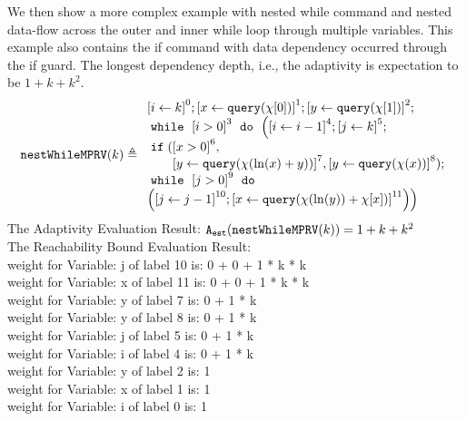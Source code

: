             \begin{example}
   \label{ex:nestedWhileMPRV}
   We then show a more complex example with nested while command and nested data-flow across the outer and inner while loop through multiple variables.
   This example also contains the if command with data dependency occurred through the if guard.
   The longest dependency depth, i.e., the adaptivity is expectation to be $1 + k + k^2 $.
   \[
   \kw{nestWhileMPRV}(k) \triangleq 
   \begin{array}{l}
\clabel{\assign{i}{k} }^{0} ; 
\clabel{ \assign{x}{\query(\chi[0])}}^{1} ; 
\clabel{ \assign{y}{\query(\chi[1])}}^{2} ; \\
    \ewhile ~ \clabel{i > 0}^{3} ~ \edo ~ 
    \Big(
     \clabel{\assign{i}{i-1}}^{4} ;
     \clabel{\assign{j}{k}}^{5} ;\\
     \eif(\clabel{x > 0}^6, \\
     \qquad \clabel{\assign{y}{\query(\chi(\ln(x) + y))} }^{7},
     \clabel{\assign{y}{\query(\chi(x))} }^{8} )
      ; \\
     \ewhile ~ \clabel{j > 0}^{9} ~ \edo ~ \\
     \Big(
      \clabel{\assign{j}{j-1}}^{10};
      \clabel{\assign{x}{\query(\chi(\ln(y))+\chi[x])} }^{11}
      \Big) \Big)
\end{array}
   \]
   The Adaptivity Evaluation Result: $ {\mathtt{A_{est}}}(\mathtt{nestWhileMPRV}(k)) = 1 + k + k^2$
   \\
   The Reachability Bound Evaluation Result: \\
    weight for Variable: j of label 10 is: 0 + 0 + 1 * k * k \\
    weight for Variable: x of label 11 is: 0 + 0 + 1 * k * k \\
    weight for Variable: y of label 7 is: 0 + 1 * k \\
    weight for Variable: y of label 8 is: 0 + 1 * k \\
    weight for Variable: j of label 5 is: 0 + 1 * k \\
    weight for Variable: i of label 4 is: 0 + 1 * k \\
    weight for Variable: y of label 2 is: 1 \\
    weight for Variable: x of label 1 is: 1 \\
    weight for Variable: i of label 0 is: 1 \\
   \end{example}
